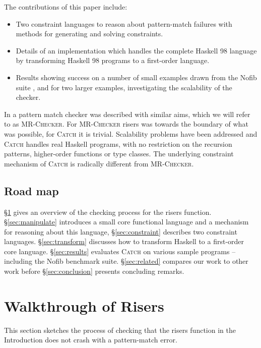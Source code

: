\documentclass[preprint]{sigplanconf}
\newcommand{\C}[1]{\textsf{#1}}
\newcommand{\catch}{\textsc{Catch}}
\newcommand{\newtool}{\anon{\catch07}{\catch}}
\newcommand{\oldtool}{\anon{\catch05}{\textsc{MR-Checker}}}
\newcommand{\anon}[2]{#2}
\begin{document}
The contributions of this paper include:

\begin{itemize}
\item Two constraint languages to reason about pattern-match failures with methods for generating and solving constraints.
\item Details of an implementation which handles the complete Haskell 98 language \citep{haskell} by transforming Haskell 98 programs to a first-order language.
\item Results showing success on a number of small examples drawn from the Nofib suite \citep{nofib}, and for two larger examples, investigating the scalability of the checker.
\end{itemize}

In \citet{me:catch_tfp} a pattern match checker was described with similar aims, which we will refer to as \oldtool{}\anon{\footnote{Although the paper was completed in 2005, publication was delayed}}{}. For \oldtool{} \C{risers} was towards the boundary of what was possible, for \newtool{} it is trivial. Scalability problems have been addressed and \newtool{} handles real Haskell programs, with no restriction on the recursion patterns, higher-order functions or type classes. The underlying constraint mechanism of \newtool{} is radically different from \oldtool{}.

\subsection{Road map}

\S\ref{sec:walkthrough} gives an overview of the checking process for the \C{risers} function. \S\ref{sec:manipulate} introduces a small core functional language and a mechanism for reasoning about this language, \S\ref{sec:constraint} describes two constraint languages. \S\ref{sec:transform} discusses how to transform Haskell to a first-order core language. \S\ref{sec:results} evaluates \newtool{} on various sample programs -- including the Nofib benchmark suite. \S\ref{sec:related} compares our work to other work before \S\ref{sec:conclusion} presents concluding remarks.

\section{Walkthrough of Risers}
\label{sec:walkthrough}

This section sketches the process of checking that the \C{risers} function in the Introduction does not crash with a pattern-match error.
\end{document}
